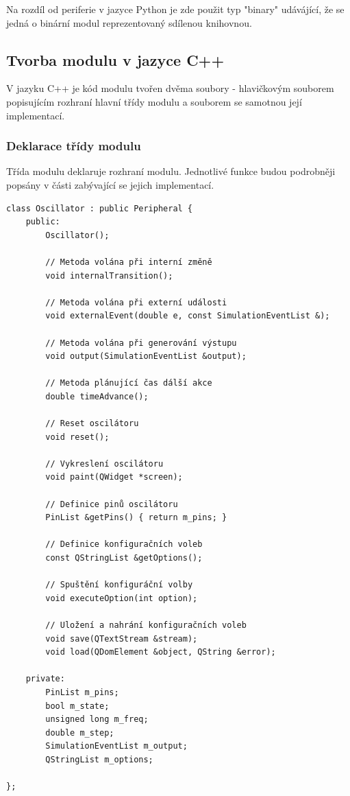 Na rozdíl od periferie v jazyce Python je zde použit typ "binary" udávájící, že se jedná o binární modul reprezentovaný sdílenou knihovnou.

\subsection{Tvorba modulu v jazyce C++}

V jazyku C++ je kód modulu tvořen dvěma soubory - hlavičkovým souborem popisujícím rozhraní hlavní třídy modulu a souborem se samotnou její implementací.

\subsubsection{Deklarace třídy modulu}

Třída modulu deklaruje rozhraní modulu. Jednotlivé funkce budou podrobněji popsány v části zabývající se jejich implementací.

\begin{lstlisting}
class Oscillator : public Peripheral {
	public:
		Oscillator();

		// Metoda volána při interní změně
		void internalTransition();

		// Metoda volána při externí události
		void externalEvent(double e, const SimulationEventList &);

		// Metoda volána při generování výstupu
		void output(SimulationEventList &output);

		// Metoda plánující čas dálší akce
		double timeAdvance();

		// Reset oscilátoru
		void reset();

		// Vykreslení oscilátoru
		void paint(QWidget *screen);

		// Definice pinů oscilátoru
		PinList &getPins() { return m_pins; }

		// Definice konfiguračních voleb
		const QStringList &getOptions();

		// Spuštění konfiguráční volby
		void executeOption(int option);

		// Uložení a nahrání konfiguračních voleb
		void save(QTextStream &stream);
		void load(QDomElement &object, QString &error);

	private:
		PinList m_pins;
		bool m_state;
		unsigned long m_freq;
		double m_step;
		SimulationEventList m_output;
		QStringList m_options;

};
\end{lstlisting}

